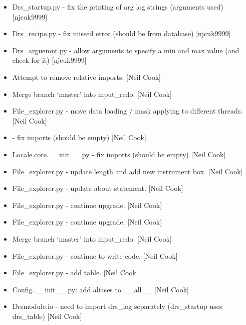 \documentclass[a4paper,10pt,english]{report}
\begin{document}
\begin{itemize}
\item {} 
Drs\_startup.py - fix the printing of arg log strings (arguments used)
{[}njcuk9999{]}

\item {} 
Drs\_recipe.py - fix missed error (should be from database) {[}njcuk9999{]}

\item {} 
Drs\_arguemnt.py - allow arguments to specify a min and max value (and
check for it) {[}njcuk9999{]}

\item {} 
Attempt to remove relative imports. {[}Neil Cook{]}

\item {} 
Merge branch ‘master’ into input\_redo. {[}Neil Cook{]}

\item {} 
File\_explorer.py - move data loading / mask applying to different
threads. {[}Neil Cook{]}

\item {} 
 - fix imports (should be empty) {[}Neil Cook{]}

\item {} 
Locale.core.\_\_init\_\_.py - fix imports (should be empty) {[}Neil Cook{]}

\item {} 
File\_explorer.py - update length and add new instrument box. {[}Neil
Cook{]}

\item {} 
File\_explorer.py - update about statement. {[}Neil Cook{]}

\item {} 
File\_explorer.py - continue upgrade. {[}Neil Cook{]}

\item {} 
File\_explorer.py - continue upgrade. {[}Neil Cook{]}

\item {} 
Merge branch ‘master’ into input\_redo. {[}Neil Cook{]}

\item {} 
File\_explorer.py - continue to write code. {[}Neil Cook{]}

\item {} 
File\_explorer.py - add table. {[}Neil Cook{]}

\item {} 
Config.\_\_init\_\_.py: add aliases to \_\_all\_\_ {[}Neil Cook{]}

\item {} 
Drsmodule.io - need to import drs\_log separately (drs\_startup uses
drs\_table) {[}Neil Cook{]}


\end{itemize}
\end{document}
